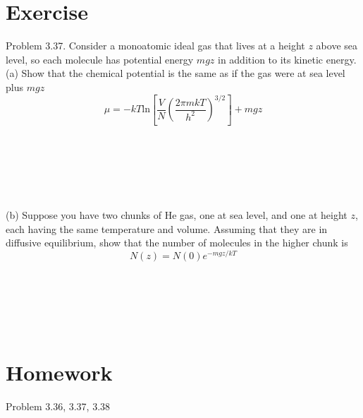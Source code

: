 \section{Exercise}
Problem 3.37. Consider a monoatomic ideal gas that lives at a height $z$ above sea level, so each molecule has potential energy $mgz$ 
in addition to its kinetic energy.\\
(a) Show that the chemical potential is the same as if the gas were at sea level plus $mgz$
\begin{equation}
  \mu  = -kT\text{ln}[\frac{V}{N} (\frac{2{\pi} mkT} {h^2})^{3/2} ] + mgz
\end{equation}
\\\\\\\\\\\\





(b) Suppose you have two chunks of He gas, one at sea level, and one at height $z$, each having the same temperature and volume.
Assuming that they are in diffusive equilibrium, show that the number of molecules in the higher chunk is
\begin{equation}
  N(z)  = N(0)e^{-mgz/kT}
\end{equation}
\\\\\\\\\\


\section{Homework}
Problem 3.36, 3.37, 3.38

